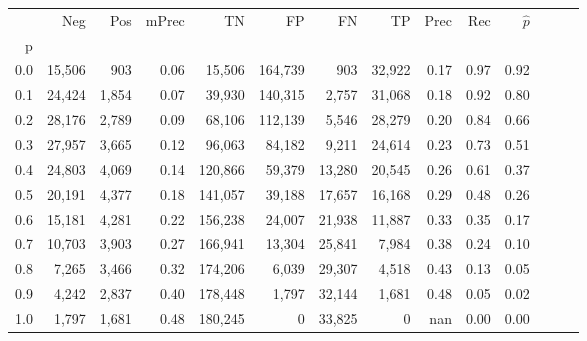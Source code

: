 \begin{tabular}{rrrrrrrrrrrrrr}
\toprule
{} &     Neg &    Pos & mPrec &       TN &       FP &      FN &      TP &  Prec &   Rec & $\hat{p}$ \\
p   &         &        &       &          &          &         &         &       &       &           \\
\midrule
0.0 &  15,506 &    903 &  0.06 &   15,506 &  164,739 &     903 &  32,922 &  0.17 &  0.97 &      0.92 \\
0.1 &  24,424 &  1,854 &  0.07 &   39,930 &  140,315 &   2,757 &  31,068 &  0.18 &  0.92 &      0.80 \\
0.2 &  28,176 &  2,789 &  0.09 &   68,106 &  112,139 &   5,546 &  28,279 &  0.20 &  0.84 &      0.66 \\
0.3 &  27,957 &  3,665 &  0.12 &   96,063 &   84,182 &   9,211 &  24,614 &  0.23 &  0.73 &      0.51 \\
0.4 &  24,803 &  4,069 &  0.14 &  120,866 &   59,379 &  13,280 &  20,545 &  0.26 &  0.61 &      0.37 \\
0.5 &  20,191 &  4,377 &  0.18 &  141,057 &   39,188 &  17,657 &  16,168 &  0.29 &  0.48 &      0.26 \\
0.6 &  15,181 &  4,281 &  0.22 &  156,238 &   24,007 &  21,938 &  11,887 &  0.33 &  0.35 &      0.17 \\
0.7 &  10,703 &  3,903 &  0.27 &  166,941 &   13,304 &  25,841 &   7,984 &  0.38 &  0.24 &      0.10 \\
0.8 &   7,265 &  3,466 &  0.32 &  174,206 &    6,039 &  29,307 &   4,518 &  0.43 &  0.13 &      0.05 \\
0.9 &   4,242 &  2,837 &  0.40 &  178,448 &    1,797 &  32,144 &   1,681 &  0.48 &  0.05 &      0.02 \\
1.0 &   1,797 &  1,681 &  0.48 &  180,245 &        0 &  33,825 &       0 &   nan &  0.00 &      0.00 \\
\bottomrule
\end{tabular}
